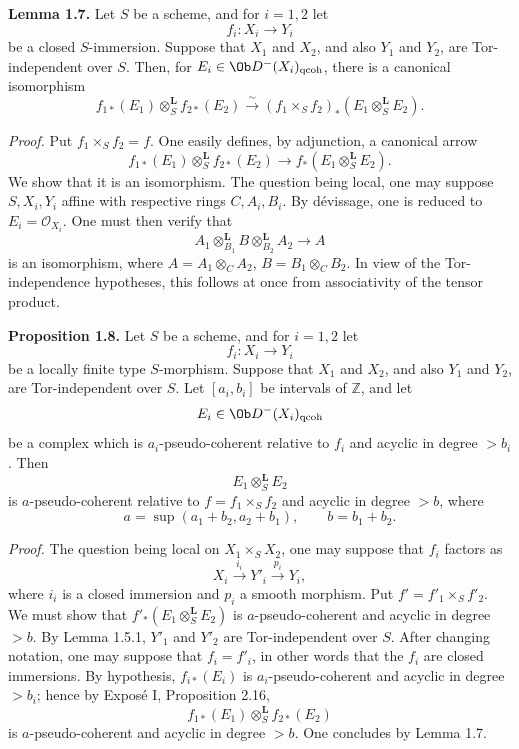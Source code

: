 \documentclass[11pt]{article}
\begin{document}
\textbf{Lemma 1.7.} Let \(S\) be a scheme, and for \(i=1,2\) let
\[
  f_i:X_i\longrightarrow Y_i
\]
be a closed \(S\)-immersion. Suppose that \(X_1\) and \(X_2\), and also \(Y_1\) and \(Y_2\), are Tor-independent over \(S\). Then, for \(E_i\in \Ob D^{-}(X_i)_{\mathrm{qcoh}}\), there is a canonical isomorphism
\[
  f_{1*}(E_1)\otimes_S^{\mathbf L} f_{2*}(E_2)
  \xrightarrow{\sim}
  (f_1\times_S f_2)_*(E_1\otimes_S^{\mathbf L}E_2).
\]

\emph{Proof.} Put \(f_1\times_Sf_2=f\). One easily defines, by adjunction, a canonical arrow
\[
  f_{1*}(E_1)\otimes_S^{\mathbf L} f_{2*}(E_2)
  \longrightarrow
  f_*(E_1\otimes_S^{\mathbf L}E_2).
\]
We show that it is an isomorphism. The question being local, one may suppose \(S,X_i,Y_i\) affine with respective rings \(C,A_i,B_i\). By dévissage, one is reduced to \(E_i=\mathcal O_{X_i}\). One must then verify that
\[
  A_1\otimes^{\mathbf L}_{B_1}B\otimes^{\mathbf L}_{B_2}A_2
  \longrightarrow A
\]
is an isomorphism, where \(A=A_1\otimes_C A_2\), \(B=B_1\otimes_C B_2\). In view of the Tor-independence hypotheses, this follows at once from associativity of the tensor product.

\textbf{Proposition 1.8.} Let \(S\) be a scheme, and for \(i=1,2\) let
\[
  f_i:X_i\longrightarrow Y_i
\]
be a locally finite type \(S\)-morphism. Suppose that \(X_1\) and \(X_2\), and also \(Y_1\) and \(Y_2\), are Tor-independent over \(S\). Let \([a_i,b_i]\) be intervals of \(\mathbb Z\), and let
\[
  E_i\in \Ob D^{-}(X_i)_{\mathrm{qcoh}}
\]
be a complex which is \(a_i\)-pseudo-coherent relative to \(f_i\) and acyclic in degree \(>b_i\). Then
\[
  E_1\otimes_S^{\mathbf L}E_2
\]
is \(a\)-pseudo-coherent relative to \(f=f_1\times_S f_2\) and acyclic in degree \(>b\), where
\[
  a=\sup(a_1+b_2,a_2+b_1),\qquad b=b_1+b_2.
\]

\emph{Proof.} The question being local on \(X_1\times_SX_2\), one may suppose that \(f_i\) factors as
\[
  X_i\xrightarrow{i_i}Y'_i\xrightarrow{p_i}Y_i,
\]
where \(i_i\) is a closed immersion and \(p_i\) a smooth morphism. Put \(f'=f'_1\times_Sf'_2\). We must show that \(f'_*(E_1\otimes_S^{\mathbf L}E_2)\) is \(a\)-pseudo-coherent and acyclic in degree \(>b\). By Lemma 1.5.1, \(Y'_1\) and \(Y'_2\) are Tor-independent over \(S\). After changing notation, one may suppose that \(f_i=f'_i\), in other words that the \(f_i\) are closed immersions. By hypothesis, \(f_{i*}(E_i)\) is \(a_i\)-pseudo-coherent and acyclic in degree \(>b_i\); hence by Exposé I, Proposition 2.16,
\[
  f_{1*}(E_1)\otimes_S^{\mathbf L}f_{2*}(E_2)
\]
is \(a\)-pseudo-coherent and acyclic in degree \(>b\). One concludes by Lemma 1.7.
\end{document}
